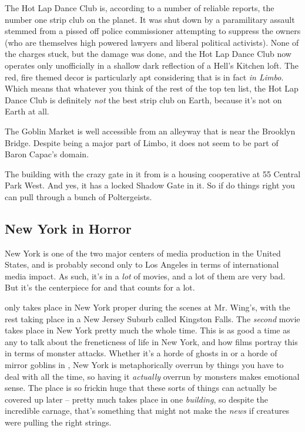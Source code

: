 The Hot Lap Dance Club is, according to a number of reliable reports, the number one strip club on the planet. It was shut down by a paramilitary assault stemmed from a pissed off police commissioner attempting to suppress the owners (who are themselves high powered lawyers and liberal political activists). None of the charges stuck, but the damage was done, and the Hot Lap Dance Club now operates only unofficially in a shallow dark reflection of a Hell's Kitchen loft. The red, fire themed decor is particularly apt considering that is in fact \textit{in Limbo}. Which means that whatever you think of the rest of the top ten list, the Hot Lap Dance Club is definitely \textit{not} the best strip club on Earth, because it's not on Earth at all.

The Goblin Market is well accessible from an alleyway that is near the Brooklyn Bridge. Despite being a major part of Limbo, it does not seem to be part of Baron Capac's domain.

The building with the crazy gate in it from  is a housing cooperative at 55 Central Park West. And yes, it has a locked Shadow Gate in it. So if do things right you can pull through a bunch of Poltergeists.

\subsection{New York in Horror}

\hspace{\parindent} New York is one of the two major centers of media production in the United States, and is probably second only to Los Angeles in terms of international media impact. As such, it's in a \textit{lot} of movies, and a lot of them are very bad. But it's the centerpiece for  and that counts for a lot.

 only takes place in New York proper during the scenes at Mr. Wing's, with the rest taking place in a New Jersey Suburb called Kingston Falls. The \textit{second} movie takes place in New York pretty much the whole time. This is as good a time as any to talk about the freneticness of life in New York, and how films portray this in terms of monster attacks. Whether it's a horde of ghosts in  or a horde of mirror goblins in , New York is metaphorically overrun by things you have to deal with all the time, so having it \textit{actually} overrun by monsters makes emotional sense. The place is so frickin huge that these sorts of things can actually be covered up later --  pretty much takes place in one \textit{building}, so despite the incredible carnage, that's something that might not make the \textit{news} if creatures were pulling the right strings.

